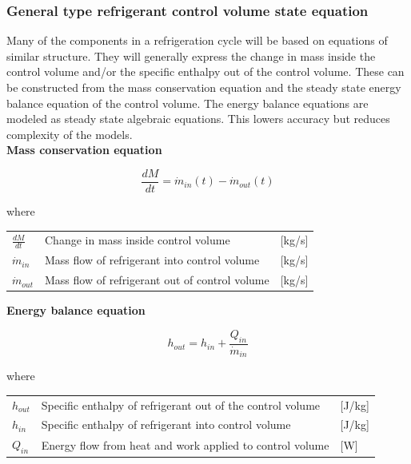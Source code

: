 \subsubsection{General type refrigerant control volume state equation}
Many of the components in a refrigeration cycle will be based on equations of similar structure. They will generally express the change in mass inside the control volume and/or the specific enthalpy out of the control volume. These can be constructed from the mass conservation equation and the steady state energy balance equation of the control volume. The energy balance equations are modeled as steady state algebraic equations. This lowers accuracy but reduces complexity of the models.\\

\noindent \textbf{Mass conservation equation}

\begin{equation} \label{eq:GeneralTypeControlVol_MassConservation}
	\frac{dM}{dt} = \dot{m}_{in}(t) - \dot{m}_{out}(t)
\end{equation}

where

\begin{center}
	\begin{tabular}{l p{8cm} l}
		$\frac{dM}{dt}$ 	& Change in mass inside control volume & [\si{kg}/\si{s}]\\
		$\dot{m}_{in}$ 		& Mass flow of refrigerant into control volume & [\si{kg}/\si{s}]\\
		$\dot{m}_{out}$ 	& Mass flow of refrigerant out of control volume & [\si{kg}/\si{s}]\\
	\end{tabular}
\end{center}

\noindent \textbf{Energy balance equation}

\begin{equation}
	h_{out} = h_{in} + \frac{Q_{in}}{\dot{m}_{in}}
\end{equation}

where

\begin{center}
	\begin{tabular}{l p{8cm} l}
		$h_{out}$ 		& Specific enthalpy of refrigerant out of the control volume & [\si{J}/\si{kg}]\\
		$h_{in}$ 		& Specific enthalpy of refrigerant into control volume & [\si{J}/\si{kg}]\\
		$Q_{in}$ 		& Energy flow from heat and work applied to control volume & [\si{W}]\\
	\end{tabular}
\end{center}

